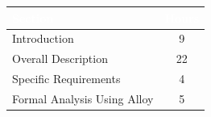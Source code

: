 \begin{table}[h!]
    \centering
    \begin{tabular}{|l|c|}
        \hline
        \rowcolor[HTML]{5C8A99}
        \textbf{\textcolor{white}{Section}} & \textbf{\textcolor{white}{Hours}} \\ \hline
        Introduction                       & 9     \\ \hline
        Overall Description                & 22     \\ \hline
        Specific Requirements              & 4      \\ \hline
        Formal Analysis Using Alloy        & 5      \\ \hline
    \end{tabular}
\end{table}